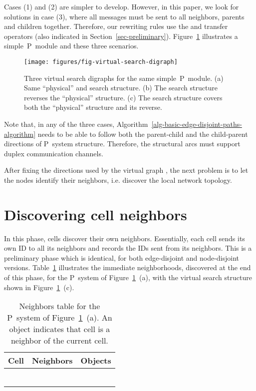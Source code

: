 \documentclass[preliminary,copyright,creativecommons]{eptcs}
\theoremstyle{remark}
\begin{document}
Cases (1) and (2) are simpler to develop. 
However, in this paper, we look for solutions in case (3), where 
all messages must be sent to all neighbors, parents and children together. 
Therefore, our rewriting rules use the  and
 transfer operators 
(also indicated in Section~\ref{sec-preliminary}).
Figure~\ref{fig-virtual-search-digraph} illustrates 
a simple~P~module and these three scenarios.

\begin{figure}[h]
\centerline{\texttt{[image: figures/fig-virtual-search-digraph]}}
\caption{Three virtual search digraphs for the same simple~P~module.
(a) Same ``physical'' and search structure.
(b) The search structure reverses the ``physical'' structure.
(c) The search structure covers both the ``physical'' structure and its reverse.}
\label{fig-virtual-search-digraph}
\end{figure}

Note that, in any of the three cases, 
Algorithm~\ref{alg-basic-edge-disjoint-paths-algorithm} needs to be able
to follow both the parent-child and the child-parent directions of P~system structure.
Therefore, the structural arcs must support duplex communication channels.

After fixing the directions used by the virtual graph , 
the next problem is to let the nodes identify their neighbors, 
i.e. discover the local network topology.


\section{Discovering cell neighbors}
\label{sec-cell-neighborhoods}

In this phase, cells discover their own neighbors.
Essentially, each cell sends its own ID to all its neighbors and
records the IDs sent from its neighbors.
This is a preliminary phase which is identical, 
for both edge-disjoint and node-disjoint versions.
Table~\ref{tab-neighbors} illustrates the immediate neighborhoods,
discovered at the end of this phase, for the P~system of
Figure~\ref{fig-virtual-search-digraph}~(a), with
the virtual search structure shown in 
Figure~\ref{fig-virtual-search-digraph}~(c). 

\setcounter{table}{\thefigure}
\begin{table}[ht] 
\caption{Neighbors table for the P~system of 
Figure~\ref{fig-virtual-search-digraph}~(a).
An object  indicates that cell  is a neighbor of the current cell.}
\label{tab-neighbors}
\begin{center}
\begin{tabular}{ | c | c | c | } \hline
Cell & Neighbors & Objects \\ \hline 
 &  &  \\ \hline
 &  &  \\ \hline
 &  &  \\ \hline
 &  &  \\ \hline
 &  &  \\ \hline
 &  &  \\ \hline
\end{tabular}
\end{center}
\end{table} 
\addtocounter{figure}{1}
\end{document}
